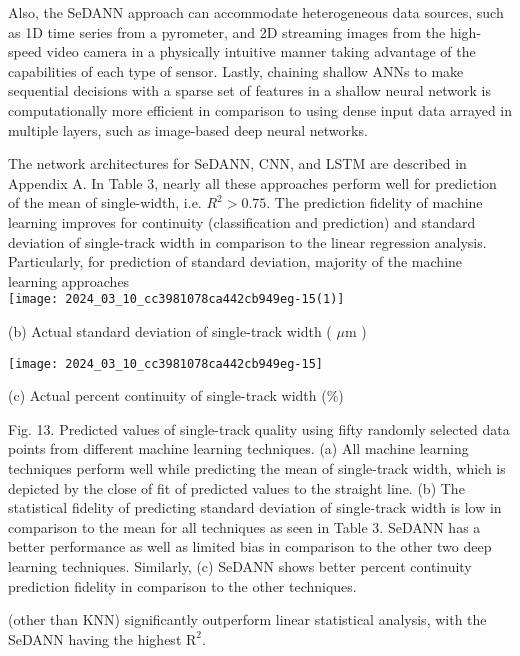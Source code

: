 \documentclass[10pt]{article}
\begin{document}
Also, the SeDANN approach can accommodate heterogeneous data sources, such as 1D time series from a pyrometer, and 2D streaming images from the high-speed video camera in a physically intuitive manner taking advantage of the capabilities of each type of sensor. Lastly, chaining shallow ANNs to make sequential decisions with a sparse set of features in a shallow neural network is computationally more efficient in comparison to using dense input data arrayed in multiple layers, such as image-based deep neural networks.

The network architectures for SeDANN, CNN, and LSTM are described in Appendix A. In Table 3, nearly all these approaches perform well for prediction of the mean of single-width, i.e. $R^{2}>0.75$. The prediction fidelity of machine learning improves for continuity (classification and prediction) and standard deviation of single-track width in comparison to the linear regression analysis. Particularly, for prediction of standard deviation, majority of the machine learning approaches\\
\texttt{[image: 2024\_03\_10\_cc3981078ca442cb949eg-15(1)]}

(b) Actual standard deviation of single-track width ( $\mu \mathrm{m}$ )

\begin{center}
\texttt{[image: 2024\_03\_10\_cc3981078ca442cb949eg-15]}
\end{center}

(c) Actual percent continuity of single-track width (\%)

Fig. 13. Predicted values of single-track quality using fifty randomly selected data points from different machine learning techniques. (a) All machine learning techniques perform well while predicting the mean of single-track width, which is depicted by the close of fit of predicted values to the straight line. (b) The statistical fidelity of predicting standard deviation of single-track width is low in comparison to the mean for all techniques as seen in Table 3. SeDANN has a better performance as well as limited bias in comparison to the other two deep learning techniques. Similarly, (c) SeDANN shows better percent continuity prediction fidelity in comparison to the other techniques.

(other than KNN) significantly outperform linear statistical analysis, with the SeDANN having the highest $\mathrm{R}^{2}$.
\end{document}
